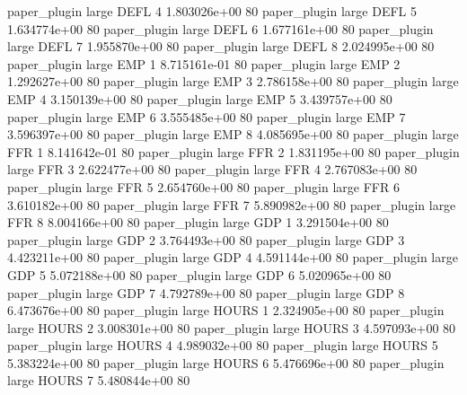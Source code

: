        paper_plugin      large     DEFL                 4 1.803026e+00 80
       paper_plugin      large     DEFL                 5 1.634774e+00 80
       paper_plugin      large     DEFL                 6 1.677161e+00 80
       paper_plugin      large     DEFL                 7 1.955870e+00 80
       paper_plugin      large     DEFL                 8 2.024995e+00 80
       paper_plugin      large      EMP                 1 8.715161e-01 80
       paper_plugin      large      EMP                 2 1.292627e+00 80
       paper_plugin      large      EMP                 3 2.786158e+00 80
       paper_plugin      large      EMP                 4 3.150139e+00 80
       paper_plugin      large      EMP                 5 3.439757e+00 80
       paper_plugin      large      EMP                 6 3.555485e+00 80
       paper_plugin      large      EMP                 7 3.596397e+00 80
       paper_plugin      large      EMP                 8 4.085695e+00 80
       paper_plugin      large      FFR                 1 8.141642e-01 80
       paper_plugin      large      FFR                 2 1.831195e+00 80
       paper_plugin      large      FFR                 3 2.622477e+00 80
       paper_plugin      large      FFR                 4 2.767083e+00 80
       paper_plugin      large      FFR                 5 2.654760e+00 80
       paper_plugin      large      FFR                 6 3.610182e+00 80
       paper_plugin      large      FFR                 7 5.890982e+00 80
       paper_plugin      large      FFR                 8 8.004166e+00 80
       paper_plugin      large      GDP                 1 3.291504e+00 80
       paper_plugin      large      GDP                 2 3.764493e+00 80
       paper_plugin      large      GDP                 3 4.423211e+00 80
       paper_plugin      large      GDP                 4 4.591144e+00 80
       paper_plugin      large      GDP                 5 5.072188e+00 80
       paper_plugin      large      GDP                 6 5.020965e+00 80
       paper_plugin      large      GDP                 7 4.792789e+00 80
       paper_plugin      large      GDP                 8 6.473676e+00 80
       paper_plugin      large    HOURS                 1 2.324905e+00 80
       paper_plugin      large    HOURS                 2 3.008301e+00 80
       paper_plugin      large    HOURS                 3 4.597093e+00 80
       paper_plugin      large    HOURS                 4 4.989032e+00 80
       paper_plugin      large    HOURS                 5 5.383224e+00 80
       paper_plugin      large    HOURS                 6 5.476696e+00 80
       paper_plugin      large    HOURS                 7 5.480844e+00 80
